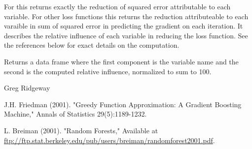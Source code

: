 \begin{Details}\relax
For  this returns exactly the reduction 
of squared error attributable to each variable. For other loss functions this 
returns the reduction attributeable to each varaible in sum of squared error in 
predicting the gradient on each iteration. It describes the relative influence 
of each variable in reducing the loss function. See the references below for 
exact details on the computation.
\end{Details}
\begin{Value}
Returns a data frame where the first component is the variable name and the
second is the computed relative influence, normalized to sum to 100.
\end{Value}
\begin{Author}\relax
Greg Ridgeway 
\end{Author}
\begin{References}\relax
J.H. Friedman (2001). "Greedy Function Approximation: A Gradient Boosting
Machine," Annals of Statistics 29(5):1189-1232.

L. Breiman (2001). "Random Forests," Available at \url{ftp://ftp.stat.berkeley.edu/pub/users/breiman/randomforest2001.pdf}.
\end{References}
\begin{SeeAlso}\relax
{}
\end{SeeAlso}

